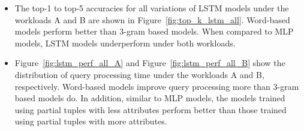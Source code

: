 \documentclass[conference]{IEEEtran}
\begin{document}
\begin{itemize}
	\item The top-1 to top-5 accuracies for all variations of LSTM models under the workloads A and B are shown in Figure~\ref{fig:top_k_lstm_all}. 
	Word-based models perform better than 3-gram based models. When compared to MLP models, LSTM models underperform under both workloads.
	\item Figure~\ref{fig:lstm_perf_all_A} and Figure~\ref{fig:lstm_perf_all_B} show the distribution of query processing time under the workloads A and B, respectively. 
	Word-based models improve query processing more than 3-gram based models do. 
	In addition, similar to MLP models, the models trained using partial tuples with less attributes perform better than those trained using partial tuples with more attributes.
\end{itemize}
\end{document}
